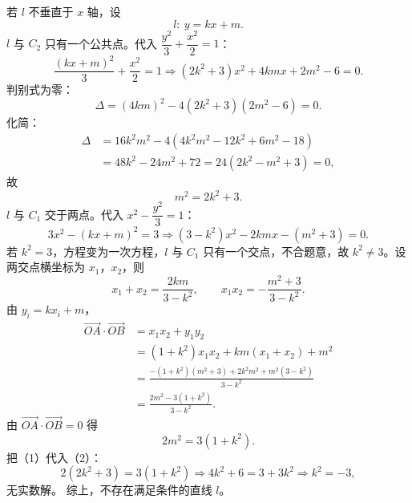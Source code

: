 \begin{answer}
若 $l$ 不垂直于 $x$ 轴，设
\nopagebreak[4]
\[l:\ y=kx+m .\]
$l$ 与 $C_2$ 只有一个公共点。代入 $\dfrac{y^2}3+\dfrac{x^2}2=1$：
\nopagebreak[4]
\[\frac{(kx+m)^2}3+\frac{x^2}2=1
\Longrightarrow(2k^2+3)x^2+4kmx+2m^2-6=0 .\]
判别式为零：
\nopagebreak[4]
\[\Delta=(4km)^2-4(2k^2+3)(2m^2-6)=0 .\]
化简：
\nopagebreak[4]
\[\begin{aligned}
\Delta&=16k^2m^2-4\left(4k^2m^2-12k^2+6m^2-18\right)\\
&=48k^2-24m^2+72=24\left(2k^2-m^2+3\right)=0,
\end{aligned}\]
故
\nopagebreak[4]
\[m^2=2k^2+3. \tag{1}\]
$l$ 与 $C_1$ 交于两点。代入 $x^2-\dfrac{y^2}3=1$：
\nopagebreak[4]
\[3x^2-(kx+m)^2=3\Longrightarrow(3-k^2)x^2-2kmx-(m^2+3)=0 .\]
若 $k^2=3$，方程变为一次方程，$l$ 与 $C_1$ 只有一个交点，不合题意，故 $k^2\neq3$。设两交点横坐标为 $x_1$，$x_2$，则
\nopagebreak[4]
\[x_1+x_2=\frac{2km}{3-k^2},\qquad x_1x_2=-\frac{m^2+3}{3-k^2}.\]
由 $y_i=kx_i+m$，
\nopagebreak[4]
\[\begin{aligned}
\overrightarrow{OA}\cdot\overrightarrow{OB}
&=x_1x_2+y_1y_2\\
&=(1+k^2)x_1x_2+km(x_1+x_2)+m^2\\
&=\frac{-(1+k^2)(m^2+3)+2k^2m^2+m^2(3-k^2)}{3-k^2}\\
&=\frac{2m^2-3(1+k^2)}{3-k^2}.
\end{aligned}\]
由 $\overrightarrow{OA}\cdot\overrightarrow{OB}=0$ 得
\nopagebreak[4]
\[2m^2=3(1+k^2). \tag{2}\]
把（1）代入（2）：
\nopagebreak[4]
\[2(2k^2+3)=3(1+k^2)\Longrightarrow4k^2+6=3+3k^2\Longrightarrow k^2=-3,\]
无实数解。
综上，不存在满足条件的直线 $l$。



\end{answer}
